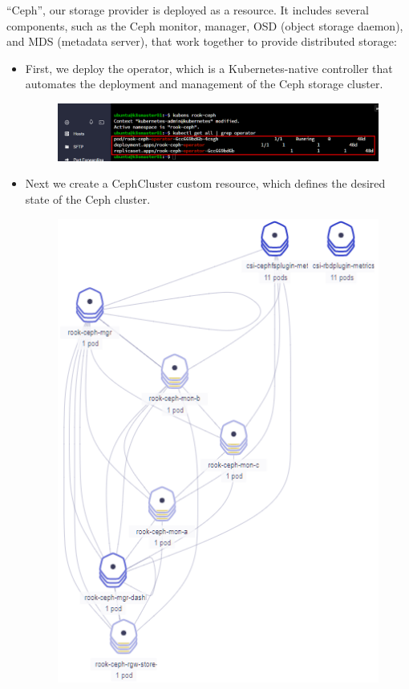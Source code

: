 “Ceph”, our storage provider is deployed as a resource. It includes several components, such as the Ceph monitor, manager, OSD (object storage daemon), and MDS (metadata server), that work together to provide distributed storage: 

\begin{itemize}[label={--}]
    \item First, we deploy the operator, which is a Kubernetes-native controller that automates the deployment and management of the Ceph storage cluster. 
    \begin{figure}[H]\centering
    \includegraphics[width=1.0\textwidth,angle=00]{assets/f27.png}
    \end{figure}
    \item Next we create a CephCluster custom resource, which defines the desired state of the Ceph cluster.
    \begin{figure}[H]\centering
    \includegraphics[width=1.0\textwidth,angle=00]{assets/f28.png}
    \end{figure}
    \end{itemize}
